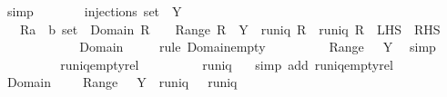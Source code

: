 \begin{isabellebody}
\ simp\isanewline
\ \ \isamarkupfalse%
\ \isamarkupfalse%
\ {\isachardoublequoteopen}{\isasymdots}\ {\isacharequal}\ injections\ {\isacharparenleft}set\ {\isacharbrackleft}{\isacharbrackright}{\isacharparenright}\ Y{\isachardoublequoteclose}\isanewline
\ \ \isamarkupfalse%
\ {\isacharminus}\isanewline
\ \ \ \ \isamarkupfalse%
\ {\isachardoublequoteopen}{\isacharbraceleft}{\isacharbraceleft}{\isacharbraceright}{\isacharbraceright}\ {\isacharequal}\ {\isacharbraceleft}R{\isacharcolon}{\isacharcolon}{\isacharparenleft}{\isacharparenleft}{\isacharprime}a\ {\isasymtimes}\ {\isacharprime}b{\isacharparenright}\ set{\isacharparenright}\ {\isachardot}\ Domain\ R\ {\isacharequal}\ {\isacharbraceleft}{\isacharbraceright}\ {\isasymand}\ Range\ R\ {\isasymsubseteq}\ Y\ {\isasymand}\ runiq\ R\ {\isasymand}\ runiq\ {\isacharparenleft}R{\isasyminverse}{\isacharparenright}{\isacharbraceright}{\isachardoublequoteclose}\ {\isacharparenleft}\ {\isachardoublequoteopen}{\isacharquery}LHS\ {\isacharequal}\ {\isacharquery}RHS{\isachardoublequoteclose}{\isacharparenright}\isanewline
\ \ \ \ \isamarkupfalse%
\isanewline
\ \ \ \ \ \ \isamarkupfalse%
\ {\isachardoublequoteopen}Domain\ {\isacharbraceleft}{\isacharbraceright}\ {\isacharequal}\ {\isacharbraceleft}{\isacharbraceright}{\isachardoublequoteclose}\ \isamarkupfalse%
\ {\isacharparenleft}rule\ Domain{\isacharunderscore}empty{\isacharparenright}\isanewline
\ \ \ \ \ \ \isamarkupfalse%
\ \isamarkupfalse%
\ {\isachardoublequoteopen}Range\ {\isacharbraceleft}{\isacharbraceright}\ {\isasymsubseteq}\ Y{\isachardoublequoteclose}\ \isamarkupfalse%
\ simp\isanewline
\ \ \ \ \ \ \isamarkupfalse%
\ \isamarkupfalse%
\ runiq{\isacharunderscore}emptyrel\isanewline
\ \ \ \ \ \ \isamarkupfalse%
\ \isamarkupfalse%
\ {\isachardoublequoteopen}runiq\ {\isacharparenleft}{\isacharbraceleft}{\isacharbraceright}{\isasyminverse}{\isacharparenright}{\isachardoublequoteclose}\ \isamarkupfalse%
\ {\isacharparenleft}simp\ add{\isacharcolon}\ runiq{\isacharunderscore}emptyrel{\isacharparenright}\isanewline
\ \ \ \ \ \ \isamarkupfalse%
\ \isamarkupfalse%
\ {\isachardoublequoteopen}Domain\ {\isacharbraceleft}{\isacharbraceright}\ {\isacharequal}\ {\isacharbraceleft}{\isacharbraceright}\ {\isasymand}\ Range\ {\isacharbraceleft}{\isacharbraceright}\ {\isasymsubseteq}\ Y\ {\isasymand}\ runiq\ {\isacharbraceleft}{\isacharbraceright}\ {\isasymand}\ runiq\ {\isacharparenleft}{\isacharbraceleft}{\isacharbraceright}{\isasyminverse}{\isacharparenright}{\isachardoublequoteclose}\ \isamarkupfalse%

\end{isabellebody}
